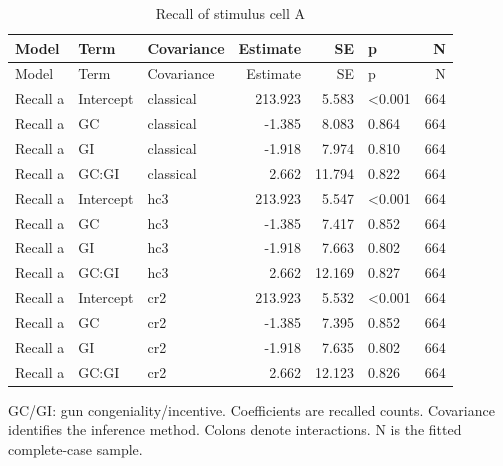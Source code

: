 
\begin{longtable}[t]{lllrrlr}
\caption{\label{tab:recalla}Recall of stimulus cell A}\\
\toprule
Model & Term & Covariance & Estimate & SE & p & N\\
\midrule
\endfirsthead
\toprule
Model & Term & Covariance & Estimate & SE & p & N\\
\midrule
\endhead
Recall a & Intercept & classical & 213.923 & 5.583 & <0.001 & 664\\
Recall a & GC & classical & -1.385 & 8.083 & 0.864 & 664\\
Recall a & GI & classical & -1.918 & 7.974 & 0.810 & 664\\
Recall a & GC:GI & classical & 2.662 & 11.794 & 0.822 & 664\\
Recall a & Intercept & hc3 & 213.923 & 5.547 & <0.001 & 664\\
Recall a & GC & hc3 & -1.385 & 7.417 & 0.852 & 664\\
Recall a & GI & hc3 & -1.918 & 7.663 & 0.802 & 664\\
Recall a & GC:GI & hc3 & 2.662 & 12.169 & 0.827 & 664\\
Recall a & Intercept & cr2 & 213.923 & 5.532 & <0.001 & 664\\
Recall a & GC & cr2 & -1.385 & 7.395 & 0.852 & 664\\
Recall a & GI & cr2 & -1.918 & 7.635 & 0.802 & 664\\
Recall a & GC:GI & cr2 & 2.662 & 12.123 & 0.826 & 664\\
\bottomrule
\end{longtable}
\noindent\footnotesize GC/GI: gun congeniality/incentive. Coefficients are recalled counts. Covariance identifies the inference method. Colons denote interactions. N is the fitted complete-case sample.\par\normalsize
